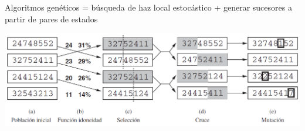 \begin{frame}{Algoritmos genéticos}
= búsqueda de haz local estocástico + generar sucesores a partir de pares de estados
\begin{center}
\includegraphics[scale=0.4]{11_image_genetic.png}\\
\end{center}

\end{frame}
